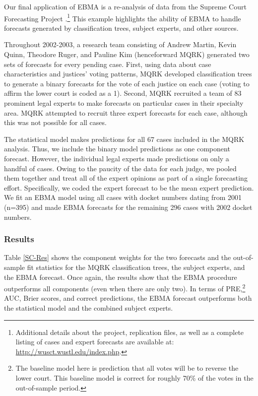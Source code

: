 \documentclass[pdftex,12pt,fullpage,oneside]{amsart}
\begin{document}
Our final application of EBMA is a re-analysis of data from the
Supreme Court Forecasting Project \citep{Ruger:2004,
  Martin:2004}.\footnote{Additional details about the project,
  replication files, as well as a complete listing of cases and expert
  forecasts are available at: \url{http://wusct.wustl.edu/index.php}.}
This example highlights the ability of EBMA to handle forecasts
generated by classification trees, subject experts, and other sources.

Throughout 2002-2003, a research team consisting of Andrew Martin,
Kevin Quinn, Theodore Ruger, and Pauline Kim (henceforward MQRK)
generated two sets of forecasts for every pending case.  First, using
data about case characteristics and justices' voting patterns, MQRK
developed classification trees to generate a binary forecasts for the
vote of each justice on each case (voting to affirm the lower court is
coded as a 1).  Second, MQRK recruited a team of 83 prominent legal
experts to make forecasts on particular cases in their specialty area.
MQRK attempted to recruit three expert forecasts for each case,
although this was not possible for all cases.

The statistical model makes predictions for all 67 cases included in
the MQRK analysis.  Thus, we include the binary model predictions as
one component forecast. However, the individual legal experts made
predictions on only a handful of cases. Owing to the paucity of the
data for each judge, we pooled them together and treat all of the
expert opinions as part of a single forecasting effort.  Specifically,
we coded the expert forecast to be the mean expert prediction. We fit
an EBMA model using all cases with docket numbers dating from 2001
(n=395) and made EBMA forecasts for the remaining 296 cases with 2002
docket numbers.

 \subsubsection{Results}

 Table \ref{SC-Res} shows the component weights for the two forecasts
 and the out-of-sample fit statistics for the MQRK classification
 trees, the subject experts, and the EBMA forecast. Once again, the
 results show that the EBMA procedure outperforms all components (even
 when there are only two).  In terms of PRE,\footnote{The baseline model
   here is prediction that all votes will be to reverse the lower
   court.  This baseline model is correct for roughly 70\% of the
   votes in the out-of-sample period.} AUC, Brier scores, and correct
 predictions, the EBMA forecast outperforms both the statistical model
 and the combined subject experts. 
\end{document}
